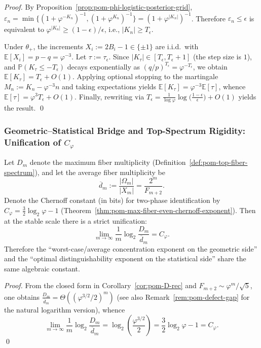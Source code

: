 \begin{proof}
By Proposition~\ref{prop:pom-phi-logistic-posterior-grid}, \(\varepsilon_n=\min\{(1+\varphi^{-K_n})^{-1},(1+\varphi^{K_n})^{-1}\}=(1+\varphi^{|K_n|})^{-1}\).
Therefore \(\varepsilon_n\le \epsilon\) is equivalent to \(\varphi^{|K_n|}\ge (1-\epsilon)/\epsilon\), i.e., \(|K_n|\ge T_\epsilon\).
\par
Under \(\theta_+\), the increments \(X_i:=2B_i-1\in\{\pm 1\}\) are i.i.d.\ with
\(
\mathbb{E}[X_i]=p-q=\varphi^{-3}
\).
Let \(\tau:=\tau_\epsilon\).
Since \(|K_\tau|\in[T_\epsilon,T_\epsilon+1]\) (the step size is \(1\)), and \(\mathbb{P}(K_\tau\le -T_\epsilon)\) decays exponentially as \((q/p)^{T_\epsilon}=\varphi^{-T_\epsilon}\),
we obtain \(\mathbb{E}[K_\tau]=T_\epsilon+O(1)\).
Applying optional stopping to the martingale \(M_n:=K_n-\varphi^{-3}n\) and taking expectations yields
\(
\mathbb{E}[K_\tau]=\varphi^{-3}\mathbb{E}[\tau]
\),
whence \(\mathbb{E}[\tau]=\varphi^{3}T_\epsilon+O(1)\).
Finally, rewriting via
\(
T_\epsilon=\frac{1}{\log\varphi}\log\bigl(\frac{1-\epsilon}{\epsilon}\bigr)+O(1)
\)
yields the result. \qed
\end{proof}

\subsubsection{Geometric--Statistical Bridge and Top-Spectrum Rigidity: Unification of \texorpdfstring{$C_\varphi$}{Cphi}}

\begin{corollary}\label{cor:pom-D-over-avg-exponent-equals-chernoff}
Let \(D_m\) denote the maximum fiber multiplicity (Definition~\ref{def:pom-top-fiber-spectrum}), and let the average fiber multiplicity be
\[
\overline d_m:=\frac{|\Omega_m|}{|X_m|}=\frac{2^m}{F_{m+2}}.
\]
Denote the Chernoff constant (in bits) for two-phase identification by
\(
C_\varphi=\frac32\log_2\varphi-1
\)
(Theorem~\ref{thm:pom-max-fiber-even-chernoff-exponent}).
Then at the stable scale there is a strict unification:
\[
\boxed{\;
\lim_{m\to\infty}\frac{1}{m}\log_2\frac{D_m}{\overline d_m}=C_\varphi.\;}
\]
Therefore the ``worst-case/average concentration exponent on the geometric side'' and the ``optimal distinguishability exponent on the statistical side'' share the same algebraic constant.
\end{corollary}

\begin{proof}
From the closed form in Corollary~\ref{cor:pom-D-rec} and \(F_{m+2}\sim \varphi^{m}/\sqrt5\), one obtains
\(
\frac{D_m}{\overline d_m}
=\Theta((\varphi^{3/2}/2)^m)
\)
(see also Remark~\ref{rem:pom-defect-gap} for the natural logarithm version), whence
\[
\lim_{m\to\infty}\frac{1}{m}\log_2\frac{D_m}{\overline d_m}
=\log_2\!\left(\frac{\varphi^{3/2}}{2}\right)
=\frac32\log_2\varphi-1
=C_\varphi.
\]
\qed
\end{proof}

